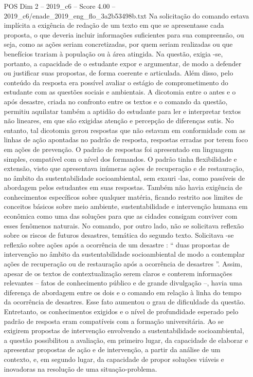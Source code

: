 \begin{textsample}{POS Dim 2 – 2019\_c6 – Score 4.00 – 2019\_c6/enade\_2019\_eng\_flo\_3a2b53498b.txt}
Na solicitação do comando estava implícita a exigência de redação de um texto em que se apresentasse cada proposta, o que deveria incluir informações suficientes para sua compreensão, ou seja, como as ações seriam concretizadas, por quem seriam realizadas ou que benefícios trariam à população ou à área atingida.
Na questão, exigia -se, portanto, a capacidade de o estudante expor e argumentar, de modo a defender ou justificar suas propostas, de forma coerente e articulada.
Além disso, pelo conteúdo da resposta era possível avaliar o estágio de comprometimento do estudante com as questões sociais e ambientais.
A dicotomia entre o antes e o após desastre, criada no confronto entre os textos e o comando da questão, permitiu aquilatar também a aptidão do estudante para ler e interpretar textos não lineares, em que são exigidas atenção e percepção de diferenças sutis.
No entanto, tal dicotomia gerou respostas que não estavam em conformidade com as linhas de ação apontadas no padrão de resposta, respostas erradas por terem foco em ações de prevenção.
O padrão de respostas foi apresentado em linguagem simples, compatível com o nível dos formandos.
O padrão tinha flexibilidade e extensão, visto que apresentava inúmeras ações de recuperação e de restauração, no âmbito da sustentabilidade socioambiental, sem exauri -las, como passíveis de abordagem pelos estudantes em suas respostas.
Também não havia exigência de conhecimentos específicos sobre qualquer matéria, ficando restrito aos limites de conceitos básicos sobre meio ambiente, sustentabilidade e intervenção humana em econômica como uma das soluções para que as cidades consigam conviver com esses fenômenos naturais.
No comando, por outro lado, não se solicitava reflexão sobre os riscos de futuros desastres, temática do segundo texto.
Solicitava -se reflexão sobre ações após a ocorrência de um desastre : “ duas propostas de intervenção no âmbito da sustentabilidade socioambiental de modo a contemplar ações de recuperação ou de restauração após a ocorrência de desastres ”.
Assim, apesar de os textos de contextualização serem claros e conterem informações relevantes – fatos de conhecimento público e de grande divulgação –, havia uma diferença de abordagem entre os dois e o comando em relação à linha do tempo da ocorrência de desastres.
Esse fato aumentou o grau de dificuldade da questão.
Entretanto, os conhecimentos exigidos e o nível de profundidade esperado pelo padrão de resposta eram compatíveis com a formação universitária.
Ao se exigirem propostas de intervenção envolvendo a sustentabilidade socioambiental, a questão possibilitou a avaliação, em primeiro lugar, da capacidade de elaborar e apresentar propostas de ação e de intervenção, a partir da análise de um contexto, e, em segundo lugar, da capacidade de propor soluções viáveis e inovadoras na resolução de uma situação-problema.

\end{textsample}
